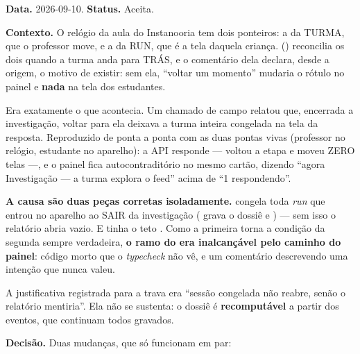 \textbf{Data.} 2026-09-10. \textbf{Status.} Aceita.

\textbf{Contexto.} O relógio da aula do Instanooria tem dois ponteiros: a
 da TURMA, que o professor move, e a  da RUN, que é a tela
daquela criança.  ()
reconcilia os dois quando a turma anda para TRÁS, e o comentário dela declara,
desde a origem, o motivo de existir: sem ela, \enquote{voltar um momento}
mudaria o rótulo no painel e \textbf{nada} na tela dos estudantes.

Era exatamente o que acontecia. Um chamado de campo relatou que, encerrada a
investigação, voltar para ela deixava a turma inteira congelada na tela da
resposta. Reproduzido de ponta a ponta com as duas pontas vivas (professor no
relógio, estudante no aparelho): a API responde
 --- voltou a etapa e
moveu ZERO telas ---, e o painel fica autocontraditório no mesmo cartão,
dizendo \enquote{agora Investigação --- a turma explora o feed} acima de
\enquote{1 respondendo}.

\textbf{A causa são duas peças corretas isoladamente.}  congela
toda \emph{run} que entrou no aparelho ao SAIR da investigação
( grava o dossiê e ) --- sem isso o relatório
abria vazio. E  tinha o teto
. Como a primeira torna a condição da
segunda sempre verdadeira, \textbf{o ramo do  era inalcançável pelo
caminho do painel}: código morto que o \emph{typecheck} não vê, e um comentário
descrevendo uma intenção que nunca valeu.

A justificativa registrada para a trava era \enquote{sessão congelada não
reabre, senão o relatório mentiria}. Ela não se sustenta: o dossiê é
\textbf{recomputável} a partir dos eventos, que continuam todos gravados.

\textbf{Decisão.} Duas mudanças, que só funcionam em par:


